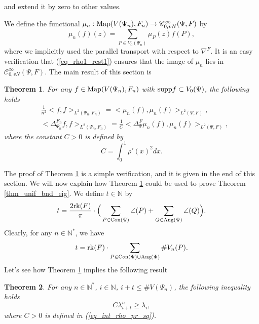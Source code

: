 \documentclass[12pt]{article}
\numberwithin{equation}{section}
\theoremstyle{theorem}
\newtheorem{thm}{Theorem}[section]
\theoremstyle{definition}
\theoremstyle{remark}
\newcommand{\nat}{\mathbb{N}}
\newcommand{\ccal}{\mathscr{C}}
\newcommand{\laplcomp}{\Delta}
\newcommand{\rk}[1]{{\rm{rk}} ( #1 )}
\newcommand{\scal}[2]{\big< #1, #2 \big>}
\begin{document}
	and extend it by zero to other values.
	\par 
	We define the functional $\mu_n : {\rm{Map}}(V(\Psi_n), F_n) \to \ccal^{\infty}_{0, vN}(\Psi, F)$ by
	\begin{equation}
		\mu_n(f)(z) = \sum_{P \in V_0(\Psi_n)} \mu_P(z) f(P),
	\end{equation}
	where we implicitly used the parallel transport with respect to $\nabla^F$.
	It is an easy verification that (\ref{eq_rho1_rest1}) ensures that the image of $\mu_n$ lies in $\ccal^{\infty}_{0, vN}(\Psi, F)$.
	The main result of this section is
	\begin{thm}\label{thm_prop_mu_n}
		For any $f \in  {\rm{Map}}(V(\Psi_n), F_n)$ with ${\rm{supp}} f \subset V_0(\Psi)$, the following holds
		\begin{align}
			&
			\frac{1}{n^2} \scal{f}{f}_{L^2(\Psi_n, F_n)} = \scal{\mu_n (f)}{\mu_n (f)}_{L^2(\Psi, F)},\label{eq_mu_ort}
			\\
			&
			\scal{\laplcomp_{\Psi_n}^{F_n} f}{f}_{L^2(\Psi_n, F_n)} = \frac{1}{C} \scal{\laplcomp_{\Psi}^{F} \mu_n (f)}{\mu_n (f)}_{L^2(\Psi, F)},\label{eq_mu_lapl}
		\end{align}
		where the constant $C > 0$ is defined by
		\begin{equation}\label{eq_int_rho_pr_sq}
			C = \int_{0}^{1} \rho'(x)^2 dx.		
		\end{equation}
	\end{thm}
	The proof of Theorem \ref{thm_prop_mu_n} is a simple verification, and it is given in the end of this section.
	We will now explain how Theorem \ref{thm_prop_mu_n} could be used to prove Theorem \ref{thm_unif_bnd_eig}.
	We define $t \in \nat$ by
	\begin{equation}\label{eq_defn_t_num1}
		t = \frac{2 \rk{F}}{\pi}  \cdot \Big( \sum_{P  \in {\rm{Con}}(\Psi)} \angle(P) +  \sum_{Q  \in {\rm{Ang}}(\Psi)} \angle(Q) \Big).
	\end{equation}
	Clearly, for any $n \in \nat^*$, we have
	\begin{equation}\label{eq_defn_t_num}
		t = \rk{F} \cdot \sum_{P  \in {\rm{Con}}(\Psi) \cup {\rm{Ang}}(\Psi)} \# V_n(P).
	\end{equation}
	Let's see how Theorem \ref{thm_prop_mu_n} implies the following result
	\begin{thm}\label{thm_unif_w_l_bound1}
		For any $n \in \nat^*$, $i \in \nat$, $i + t \leq \# V(\Psi_n)$, the following inequality holds
		\begin{equation}
			C \lambda_{i + t}^{n} \geq \lambda_i,
		\end{equation}
		where  $C > 0$ is defined in (\ref{eq_int_rho_pr_sq}). 
	\end{thm}
\end{document}
